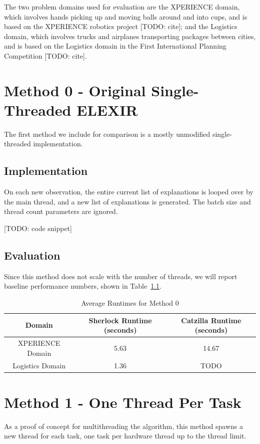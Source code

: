 \documentclass[12pt,twoside,abbrevs,msc,ai,notimes,logo,sansheadings]{infthesis}
\begin{document}
  The two problem domains used for evaluation are the XPERIENCE domain, which involves hands picking up and moving balls around and into cups, and is based on the XPERIENCE robotics project [TODO: cite]; and the Logistics domain, which involves trucks and airplanes transporting packages between cities, and is based on the Logistics domain in the First International Planning Competition [TODO: cite].
  
  \chapter {Method 0 - Original Single-Threaded ELEXIR}
  
  The first method we include for comparison is a mostly unmodified single-threaded implementation.
  
  \section {Implementation}
  
  On each new observation, the entire current list of explanations is looped over by the main thread, and a new list of explanations is generated. The batch size and thread count parameters are ignored.
  
  [TODO: code snippet]
  
  \section{Evaluation}
  
  Since this method does not scale with the number of threads, we will report baseline performance numbers, shown in Table~\ref{tab:m0}.
  
  \begin{table}
  \begin{tabular}{c c c}
  Domain & Sherlock Runtime (seconds) & Catzilla Runtime (seconds)\tabularnewline
  \hline
  XPERIENCE Domain & 5.63 & 14.67\tabularnewline
  Logistics Domain & 1.36 & TODO\tabularnewline
  \hline
  \end{tabular}
  \caption{Average Runtimes for Method 0}
  \label{tab:m0}
  \end{table}

  \chapter {Method 1 - One Thread Per Task}
  
  As a proof of concept for multithreading the algorithm, this method spawns a new thread for each task, one task per hardware thread up to the thread limit.
  
\end{document}
